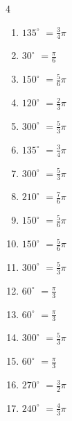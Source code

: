 \begin{multicols}{4}
\begin{enumerate}
  \item $\displaystyle 135^{\circ}$
        $\displaystyle =\frac{3}{4}\pi$

  \item $\displaystyle 30^{\circ}$
        $\displaystyle =\frac{\pi}{6}$

  \item $\displaystyle 150^{\circ}$
        $\displaystyle =\frac{5}{6}\pi$

  \item $\displaystyle 120^{\circ}$
        $\displaystyle =\frac{2}{3}\pi$

  \item $\displaystyle 300^{\circ}$
        $\displaystyle =\frac{5}{3}\pi$

  \item $\displaystyle 135^{\circ}$
        $\displaystyle =\frac{3}{4}\pi$

  \item $\displaystyle 300^{\circ}$
        $\displaystyle =\frac{5}{3}\pi$

  \item $\displaystyle 210^{\circ}$
        $\displaystyle =\frac{7}{6}\pi$

  \item $\displaystyle 150^{\circ}$
        $\displaystyle =\frac{5}{6}\pi$

\columnbreak %

  \item $\displaystyle 150^{\circ}$
        $\displaystyle =\frac{5}{6}\pi$

  \item $\displaystyle 300^{\circ}$
        $\displaystyle =\frac{5}{3}\pi$

  \item $\displaystyle 60^{\circ}$
        $\displaystyle =\frac{\pi}{3}$

  \item $\displaystyle 60^{\circ}$
        $\displaystyle =\frac{\pi}{3}$

  \item $\displaystyle 300^{\circ}$
        $\displaystyle =\frac{5}{3}\pi$

  \item $\displaystyle 60^{\circ}$
        $\displaystyle =\frac{\pi}{3}$

  \item $\displaystyle 270^{\circ}$
        $\displaystyle =\frac{3}{2}\pi$

  \item $\displaystyle 240^{\circ}$
        $\displaystyle =\frac{4}{3}\pi$


\end{enumerate}
\end{multicols}
